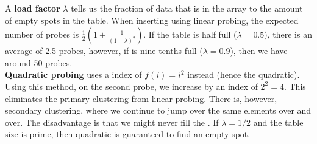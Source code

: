 \documentclass[]{article}
\begin{document}
A \textbf{load factor} $\lambda$ tells us the fraction of data that is in the array to the amount of empty spots in the table. When inserting using linear probing, the expected number of probes is $\frac{1}{2}\left( 1 + \frac{1}{(1-\lambda)^2} \right)$. If the table is half full ($\lambda = 0.5$), there is an average of 2.5 probes, however, if is nine tenths full ($\lambda = 0.9$), then we have around 50 probes.\\


\textbf{Quadratic probing} uses a index of $f(i) = i^2$ instead (hence the quadratic). Using this method, on the second probe, we increase by an index of $2^2 = 4$. This eliminates the primary clustering from linear probing. There is, however, secondary clustering, where we continue to jump over the same elements over and over. The disadvantage is that we might never fill the . If $\lambda = 1/2$ and the table size is prime, then quadratic is guaranteed to find an empty spot.\\
\end{document}
